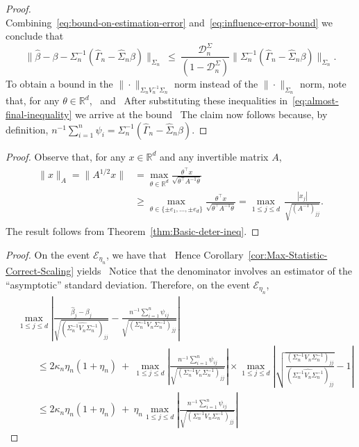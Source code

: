 \documentclass{article}
\begin{document}
\begin{appendices}
\begin{proof}
\begin{equation}
\end{equation}
Combining~\eqref{eq:bound-on-estimation-error} and~\eqref{eq:influence-error-bound} we conclude that
\begin{equation}\label{eq:almost-final-inequality}
\|\widehat{\beta} - \beta - \Sigma_n^{-1}(\widehat{\Gamma}_n - \widehat{\Sigma}_n\beta)\|_{\Sigma_n} ~\le~ \frac{\mathcal{D}_n^{\Sigma}}{(1 - \mathcal{D}_n^{\Sigma})}\|\Sigma_n^{-1}(\widehat{\Gamma}_n - \widehat{\Sigma}_n\beta)\|_{\Sigma_n}.
\end{equation}
To obtain a bound in the $\| \cdot \|_{\Sigma_n V_n^{-1}\Sigma_n}$ norm instead of the $\| \cdot \|_{\Sigma_n}$ norm, note that, for any $\theta\in\mathbb{R}^d$,
\ and
\ After substituting these inequalities in~\eqref{eq:almost-final-inequality} we arrive at the bound
\ The claim now follows because, by definition,
$n^{-1}\sum_{i=1}^n \psi_i = \Sigma_n^{-1}(\widehat{\Gamma}_n - \widehat{\Sigma}_n\beta)$.
\end{proof}
\begin{proof}
Observe that, for any $x\in\mathbb{R}^{d}$ and any invertible matrix $A$,
\begin{align}\label{eq:Scaled-Euclidean-Maximum-Comparison}
\begin{split}
\|x\|_A = \|A^{1/2}x\| &= \max_{\theta\in\mathbb{R}^{d}}\frac{\theta^{\top}x}{\sqrt{\theta^{\top}A^{-1}\theta}}\\ &\geq \max_{\theta \in \{ \pm e_1,\ldots,\pm e_d \}} \frac{\theta^{\top}x}{\sqrt{\theta^{\top}A^{-1}\theta}} = \max_{1\le j\le d}\,\frac{|x_j|}{\sqrt{(A^{-1})_{jj}}}.
\end{split}
\end{align}
The result follows from Theorem~\ref{thm:Basic-deter-ineq}.
\end{proof}
\begin{proof}
On the event $\mathcal{E}_{\eta_n}$, we have that
\ Hence Corollary~\ref{cor:Max-Statistic-Correct-Scaling} yields
\ Notice that the denominator involves an estimator of the ``asymptotic'' standard deviation. Therefore, on the event $\mathcal{E}_{\eta_n}$,
\begin{align*}
&\max_{1\le j\le d}\left|\frac{\widehat{\beta}_j - \beta_j}{\sqrt{(\widehat{\Sigma_n^{-1}V_n\Sigma_n^{-1}})_{jj}}} - \frac{n^{-1}\sum_{i=1}^n \psi_{ij}}{\sqrt{(\Sigma_n^{-1}V_n\Sigma_n^{-1})_{jj}}}\right|\\ &\qquad\le 2\kappa_n\eta_n(1 + \eta_n) ~+~ \max_{1\le j\le d}\left|\frac{n^{-1}\sum_{i=1}^n \psi_{ij}}{\sqrt{(\Sigma_n^{-1}V_n\Sigma_n^{-1})_{jj}}}\right|\times\max_{1\le j\le d}\left|\sqrt{\frac{(\Sigma_n^{-1}V_n\Sigma_n^{-1})_{jj}}{(\widehat{\Sigma_n^{-1}V_n\Sigma_n^{-1}})_{jj}}} - 1\right|\\ &\qquad\le 2\kappa_n\eta_n(1 + \eta_n) ~+~ \eta_n\max_{1\le j\le d}\left|\frac{n^{-1}\sum_{i=1}^n \psi_{ij}}{\sqrt{(\Sigma_n^{-1}V_n\Sigma_n^{-1})_{jj}}}\right|

\end{align*}
\end{proof}
\end{appendices}
\end{document}
